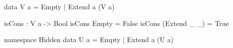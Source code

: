 \documentclass{article}
\begin{document}
\begin{code}
data V a = Empty | Extend a (V a)
\end{code}

\begin{code}
isCons : V a -> Bool
isCons Empty = False
isCons (Extend _ _) = True
\end{code}

\begin{hidden}
namespace Hidden
  data U a = Empty | Extend a (U a)
\end{hidden}
\end{document}
